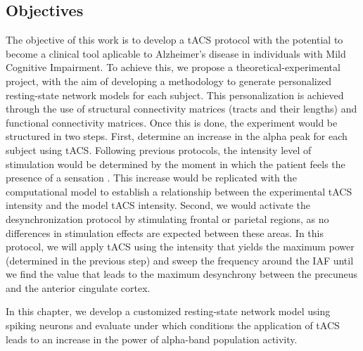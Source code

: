 \documentclass[../main.tex]{subfiles}
\begin{document}
\subsection{Objectives}
The objective of this work is to develop a tACS protocol with the potential to become a clinical tool aplicable to Alzheimer's disease in individuals with Mild Cognitive Impairment. 
To achieve this, we propose a theoretical-experimental project, with the aim of developing a methodology to generate personalized resting-state network models for each subject.
This personalization is achieved through the use of structural connectivity matrices (tracts and their lengths) and functional connectivity matrices.
Once this is done, the experiment would be structured in two steps.
First, determine an increase in the alpha peak for each subject using tACS.
Following previous protocols, the intensity level of stimulation would be determined by the moment in which the patient feels the presence of a sensation \citep{zaehle_transcranial_2010}. 
This increase would be replicated with the computational model to establish a relationship between the experimental tACS intensity and the model tACS intensity.
Second, we would activate the desynchronization protocol by stimulating frontal or parietal regions, as no differences in stimulation effects are expected between these areas.
In this protocol, we will apply tACS using the intensity that yields the maximum power (determined in the previous step) and sweep the frequency around the IAF until we find the value that leads to the maximum desynchrony between the precuneus and the anterior cingulate cortex.

In this chapter, we develop a customized resting-state network model using spiking neurons and evaluate under which conditions the application of tACS leads to an increase in the power of alpha-band population activity.
\clearpage
\end{document}
